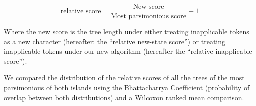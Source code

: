 \documentclass[a4paper,11pt]{article}
\begin{document}
\begin{equation}
    \text{relative score}=\frac{\text{New score}}{\text{Most parsimonious score}}-1
\end{equation}

Where the new score is the tree length under either treating inapplicable tokens as a new character (hereafter: the ``relative new-state score'') or treating inapplicable tokens under our new algorithm (hereafter the ``relative inapplicable score'').

We compared the distribution of the relative scores of all the trees of the most parsimonious of both islands using the Bhattacharrya Coefficient (probability of overlap between both distributions) and a Wilcoxon ranked mean comparison.



 
\end{document}
